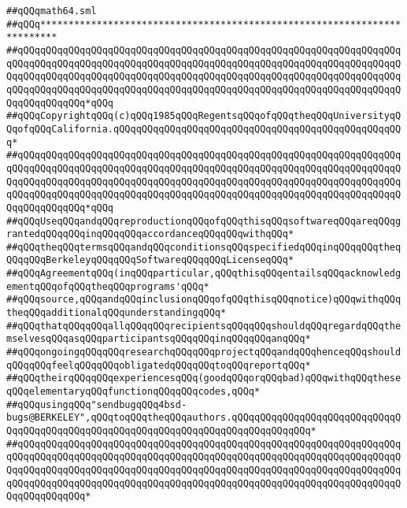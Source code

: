 \label{src/lib/std/src/math64-none.pkg}
\verb|##qQQqmath64.sml|\newline
\verb|##qQQq*************************************************************************|\newline
\verb|##qQQqqQQqqQQqqQQqqQQqqQQqqQQqqQQqqQQqqQQqqQQqqQQqqQQqqQQqqQQqqQQqqQQqqQQqqQQqqQQqqQQqqQQqqQQqqQQqqQQqqQQqqQQqqQQqqQQqqQQqqQQqqQQqqQQqqQQqqQQqqQQqqQQqqQQqqQQqqQQqqQQqqQQqqQQqqQQqqQQqqQQqqQQqqQQqqQQqqQQqqQQqqQQqqQQqqQQqqQQqqQQqqQQqqQQqqQQqqQQqqQQqqQQqqQQqqQQqqQQqqQQqqQQqqQQqqQQqqQQqqQQqqQQqqQQq*qQQq|\newline
\verb|##qQQqCopyrightqQQq(c)qQQq1985qQQqRegentsqQQqofqQQqtheqQQqUniversityqQQqofqQQqCalifornia.qQQqqQQqqQQqqQQqqQQqqQQqqQQqqQQqqQQqqQQqqQQqqQQqqQQq*|\newline
\verb|##qQQqqQQqqQQqqQQqqQQqqQQqqQQqqQQqqQQqqQQqqQQqqQQqqQQqqQQqqQQqqQQqqQQqqQQqqQQqqQQqqQQqqQQqqQQqqQQqqQQqqQQqqQQqqQQqqQQqqQQqqQQqqQQqqQQqqQQqqQQqqQQqqQQqqQQqqQQqqQQqqQQqqQQqqQQqqQQqqQQqqQQqqQQqqQQqqQQqqQQqqQQqqQQqqQQqqQQqqQQqqQQqqQQqqQQqqQQqqQQqqQQqqQQqqQQqqQQqqQQqqQQqqQQqqQQqqQQqqQQqqQQqqQQqqQQq*qQQq|\newline
\verb|##qQQqUseqQQqandqQQqreproductionqQQqofqQQqthisqQQqsoftwareqQQqareqQQqgrantedqQQqqQQqinqQQqqQQqaccordanceqQQqqQQqwithqQQq*|\newline
\verb|##qQQqtheqQQqtermsqQQqandqQQqconditionsqQQqspecifiedqQQqinqQQqqQQqtheqQQqqQQqBerkeleyqQQqqQQqSoftwareqQQqqQQqLicenseqQQq*|\newline
\verb|##qQQqAgreementqQQq(inqQQqparticular,qQQqthisqQQqentailsqQQqacknowledgementqQQqofqQQqtheqQQqprograms'qQQq*|\newline
\verb|##qQQqsource,qQQqandqQQqinclusionqQQqofqQQqthisqQQqnotice)qQQqwithqQQqtheqQQqadditionalqQQqunderstandingqQQq*|\newline
\verb|##qQQqthatqQQqqQQqallqQQqqQQqrecipientsqQQqqQQqshouldqQQqregardqQQqthemselvesqQQqasqQQqparticipantsqQQqqQQqinqQQqqQQqanqQQq*|\newline
\verb|##qQQqongoingqQQqqQQqresearchqQQqqQQqprojectqQQqandqQQqhenceqQQqshouldqQQqqQQqfeelqQQqqQQqobligatedqQQqqQQqtoqQQqreportqQQq*|\newline
\verb|##qQQqtheirqQQqqQQqexperiencesqQQq(goodqQQqorqQQqbad)qQQqwithqQQqtheseqQQqelementaryqQQqfunctionqQQqqQQqcodes,qQQq*|\newline
\verb|##qQQqusingqQQq"sendbugqQQq4bsd-bugs@BERKELEY",qQQqtoqQQqtheqQQqauthors.qQQqqQQqqQQqqQQqqQQqqQQqqQQqqQQqqQQqqQQqqQQqqQQqqQQqqQQqqQQqqQQqqQQqqQQqqQQqqQQqqQQq*|\newline
\verb|##qQQqqQQqqQQqqQQqqQQqqQQqqQQqqQQqqQQqqQQqqQQqqQQqqQQqqQQqqQQqqQQqqQQqqQQqqQQqqQQqqQQqqQQqqQQqqQQqqQQqqQQqqQQqqQQqqQQqqQQqqQQqqQQqqQQqqQQqqQQqqQQqqQQqqQQqqQQqqQQqqQQqqQQqqQQqqQQqqQQqqQQqqQQqqQQqqQQqqQQqqQQqqQQqqQQqqQQqqQQqqQQqqQQqqQQqqQQqqQQqqQQqqQQqqQQqqQQqqQQqqQQqqQQqqQQqqQQqqQQqqQQqqQQqqQQq*|\newline
